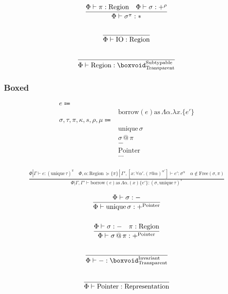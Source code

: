 \documentclass {article}
\begin{document}
\begin{gather*}
\frac
{\Phi \vdash \pi : \text{Region} \quad \Phi \vdash \sigma : +^\rho}
{\Phi \vdash \sigma^\pi : *} \\
\\
\frac
{}
{\Phi \vdash \text{IO} : \text{Region}} \\
\\
\frac
{}
{\Phi \vdash \text{Region} : \boxvoid^\text{Subtypable}_\text{Transparent}} \\
\end{gather*}

\subsubsection{Boxed}
\begin{align*}
e \Coloneqq & \\
& \text{borrow} (e) \text{as} \, \Lambda \alpha. \lambda x. \{ e' \} \\
\sigma, \tau, \pi, \kappa, s, \rho, \mu \Coloneqq & \\
& \text{unique} \, \sigma \\
& \sigma \, @ \, \pi \\
& - \tag{Boxed} \\
& \text{Pointer} \tag{Pointer Representation} \\
& \dots \\
\end{align*}

\begin{gather*}
\frac
{\Phi | \Gamma \vdash e : (\text{unique} \, \tau)^\pi \quad \Phi,\alpha : \text{Region} \, \succeq \{ \pi \} \, | \, \Gamma', [x : \forall \alpha'. (\tau @ \alpha)^{\alpha'}] \vdash e' : \sigma^\alpha \quad \alpha \notin \text{Free}(\sigma, \pi)}
{\Phi | \Gamma, \Gamma' \vdash \text{borrow} (e) \text{as} \, \Lambda \alpha. (x) \{ e' \} : (\sigma, \text{unique} \, \tau)^\pi }
\end{gather*}

\begin{gather*}
\frac
{\Phi \vdash \sigma : -}
{\Phi \vdash \text{unique} \, \sigma : +^\text{Pointer}} \\
\\
\frac
{\Phi \vdash \sigma : - \quad \pi : \text{Region}}
{\Phi \vdash \sigma \, @ \, \pi : +^\text{Pointer}} \\
\\
\frac
{}
{\Phi \vdash - : \boxvoid^\text{Invariant}_\text{Transparent}} \\
\\
\frac
{}
{\Phi \vdash \text{Pointer} : \text{Representation}} \\
\end{gather*}
\end{document}

